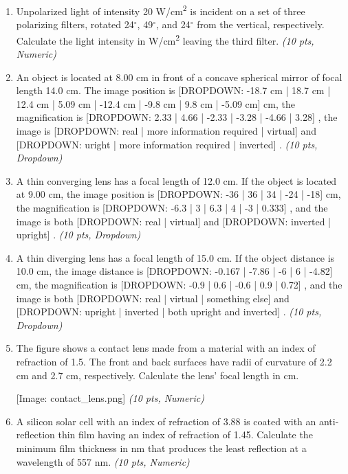 \documentclass[11pt]{article}
\begin{document}
\begin{enumerate}[leftmargin=*]
  \item Unpolarized light of intensity 20 W/cm\textsuperscript{2} is incident on a set of three polarizing filters, rotated 24$^{\circ}$, 49$^{\circ}$, and 24$^{\circ}$ from the vertical, respectively. Calculate the light intensity in W/cm\textsuperscript{2} leaving the third filter. \hfill \textit{(10 pts, Numeric)}

  \item An object is located at 8.00 cm in front of a concave spherical mirror of focal length 14.0 cm. The image position is [DROPDOWN: -18.7 cm | 18.7 cm | 12.4 cm | 5.09 cm | -12.4 cm | -9.8 cm | 9.8 cm | -5.09 cm]
cm, the magnification is [DROPDOWN: 2.33 | 4.66 | -2.33 | -3.28 | -4.66 | 3.28]
, the image is [DROPDOWN: real | more information required | virtual]
and [DROPDOWN: uright | more information required | inverted]
. \hfill \textit{(10 pts, Dropdown)}

  \item A thin converging lens has a focal length of 12.0 cm. If the object is located at 9.00 cm, the image position is [DROPDOWN: -36 | 36 | 34 | -24 | -18]
cm, the magnification is [DROPDOWN: -6.3 | 3 | 6.3 | 4 | -3 | 0.333]
, and the image is both [DROPDOWN: real | virtual]
and [DROPDOWN: inverted | upright]
. \hfill \textit{(10 pts, Dropdown)}

  \item A thin diverging lens has a focal length of 15.0 cm. If the object distance is 10.0 cm, the image distance is [DROPDOWN: -0.167 | -7.86 | -6 | 6 | -4.82]
cm, the magnification is [DROPDOWN: -0.9 | 0.6 | -0.6 | 0.9 | 0.72]
, and the image is both [DROPDOWN: real | virtual | something else]
and [DROPDOWN: upright | inverted | both upright and inverted]
. \hfill \textit{(10 pts, Dropdown)}

  \item The figure shows a contact lens made from a material with an index of refraction of 1.5. The front and back surfaces have radii of curvature of 2.2 cm and 2.7 cm, respectively. Calculate the lens' focal length in cm.

[Image: contact\_lens.png] \hfill \textit{(10 pts, Numeric)}

  \item A silicon solar cell with an index of refraction of 3.88 is coated with an anti-reflection thin film having an index of refraction of 1.45. Calculate the minimum film thickness in nm that produces the least reflection at a wavelength of 557 nm. \hfill \textit{(10 pts, Numeric)}


\end{enumerate}
\end{document}
